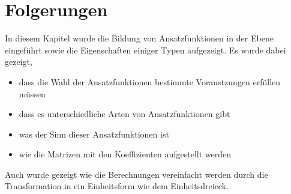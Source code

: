 %
%
%
\section{Folgerungen
\label{fem:section:folgerungen}}
In diesem Kapitel wurde die Bildung von Ansatzfunktionen in der Ebene eingeführt sowie die Eigenschaften einiger Typen aufgezeigt. Es wurde dabei gezeigt,
\begin{itemize}
	\item dass die Wahl der Ansatzfunktionen bestimmte Voraustzungen erfüllen müssen
	\item dass es unterschiedliche Arten von Ansatzfunktionen gibt
	\item was der Sinn dieser Ansatzfunktionen ist
	\item wie die Matrizen mit den Koeffizienten aufgestellt werden
\end{itemize}
Auch wurde gezeigt wie die Berechnungen vereinfacht werden durch die Transformation in ein Einheitsform wie dem Einheitsdreieck. 



